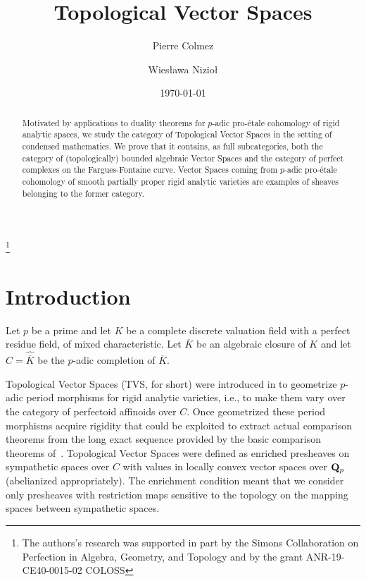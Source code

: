 \documentclass[10pt]{amsart}
\theoremstyle{definition}
\theoremstyle{remark}
\newcommand{\ovk}{\overline{K} }
\newcommand{\wh}{\widehat}
\numberwithin{equation}{section}
\def\Q{{\bf Q}} \def\Z{{\bf Z}}
\numberwithin{equation}{section}
\begin{document}
\title[Topological Vector Spaces]
 {Topological Vector Spaces}
 \author{Pierre Colmez} 
\address{CNRS, IMJ-PRG, Sorbonne Universit\'e, 4 place Jussieu, 75005 Paris, France}
\author{Wies{\l}awa Nizio{\l}}
\address{CNRS, IMJ-PRG, Sorbonne Universit\'e, 4 place Jussieu, 75005 Paris, France}
 \date{\today}
\thanks{The authors's research was supported in part by the  Simons Collaboration on Perfection in Algebra, Geometry, and Topology and by the grant ANR-19-CE40-0015-02 COLOSS}
\maketitle
 \begin{abstract}
 Motivated by applications to duality theorems 
for $p$-adic pro-\'etale cohomology of rigid analytic spaces, we study the category of Topological Vector Spaces in the setting of condensed mathematics.
 We prove that it contains, as  full subcategories, both  the category of (topologically) bounded algebraic Vector Spaces and   the category  of perfect complexes on the Fargues-Fontaine curve. Vector Spaces coming from $p$-adic pro-\'etale cohomology of smooth partially proper rigid analytic varieties are examples of sheaves belonging to the former category. 
 \end{abstract}
\tableofcontents
\section{Introduction} Let $p$ be a prime and let $K$ be a complete discrete valuation field with a perfect residue field, of mixed characteristic. Let $\ovk$ be an algebraic closure of $K$ and let $C=\wh{\ovk}$ be the $p$-adic completion of $\ovk$.  

 Topological Vector Spaces ({\rm TVS}, for short) were introduced in \cite{CN5} to geometrize $p$-adic period morphisms for rigid analytic varieties, i.e., to make them vary over the category of perfectoid affinoids over $C$.
 Once geometrized these period morphisms acquire rigidity that could be exploited to extract 
actual comparison theorems from the long exact sequence provided by the basic comparison theorems of~\cite{CN4}.
 Topological Vector Spaces were defined as enriched presheaves on sympathetic spaces over $C$ with values in locally convex vector spaces over $\Q_p$ (abelianized appropriately).
 The enrichment condition meant that we consider only presheaves with restriction maps sensitive to the topology on the mapping spaces between sympathetic spaces. 
\end{document}
